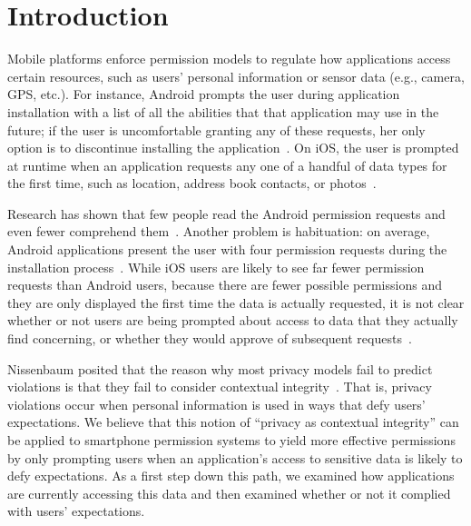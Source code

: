 \documentclass[letterpaper,twocolumn,10pt]{article}
\begin{document}
\section{Introduction}


Mobile platforms enforce permission models to regulate how applications access certain resources, such as users' personal information or sensor data (e.g., camera, GPS, etc.). For instance, Android prompts the user during application installation with a list of all the abilities that that application may use in the future; if the user is uncomfortable granting any of these requests, her only option is to discontinue installing the application~\cite{AndroidPermissions2}. On iOS, the user is prompted at runtime when an application requests any one of a handful of data types for the first time, such as location, address book contacts, or photos~\cite{OGrady2014}.

Research has shown that few people read the Android permission requests and even fewer comprehend them~\cite{Felt2012}. Another problem is habituation: on average, Android applications present the user with four permission requests during the installation process~\cite{Felt2011b}. While iOS users are likely to see far fewer permission requests than Android users, because there are fewer possible permissions and they are only displayed the first time the data is actually requested, it is not clear whether or not users are being prompted about access to data that they actually find concerning, or whether they would approve of subsequent requests~\cite{Felt2012c}.

Nissenbaum posited that the reason why most privacy models fail to predict violations is that they fail to consider contextual integrity~\cite{Nissenbaum2004}. That is, privacy violations occur when personal information is used in ways that defy users' expectations. We believe that this notion of ``privacy as contextual integrity'' can be applied to smartphone permission systems to yield more effective permissions by only prompting users when an application's access to sensitive data is likely to defy expectations. As a first step down this path, we examined how applications are currently accessing this data and then examined whether or not it complied with users' expectations.
\end{document}
